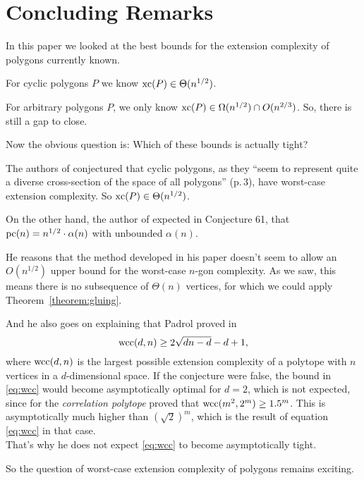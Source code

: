 \section{Concluding Remarks}

In this paper we looked at the best bounds for the extension complexity of polygons currently known. 

For cyclic polygons $P$ we know $\operatorname{xc}(P) \in \Theta(n^{1/2})$.

For arbitrary polygons $P$, we only know $\operatorname{xc}(P) \in \Omega(n^{1/2}) \cap O(n^{2/3})$. So, there is still a gap to close.

Now the obvious question is: Which of these bounds is actually tight?

The authors of \cite{kwan2020extension} conjectured that cyclic polygons, as they ``seem to represent quite a diverse cross-section of the space of all polygons'' (p.\,3), have worst-case extension complexity. So $\operatorname{xc}(P) \in \Theta(n^{1/2})$.

On the other hand, the author of \cite{shitov2020sublinear} expected in Conjecture 61, that $\operatorname{pc}(n) = n^{1/2} \cdot \alpha(n)$ with unbounded $\alpha(n)$.

He reasons that the method developed in his paper doesn't seem to allow an $O(n^{1/2})$ upper bound for the worst-case $n$-gon complexity. As we saw, this means there is no subsequence of $\Theta(n)$ vertices, for which we could apply Theorem~\ref{theorem:gluing}.

And he also goes on explaining that Padrol proved in \cite{padrol2016extension} 
\begin{equation}\label{eq:wcc}
  \operatorname{wcc}(d,n) \geq 2\sqrt{dn-d}-d+1 ,
\end{equation}
where $\operatorname{wcc}(d,n)$ is the largest possible extension complexity of a polytope with $n$ vertices in a $d$-dimensional space. 
If the conjecture were false, the bound in \eqref{eq:wcc} would become asymptotically optimal for $d=2$, which is not expected, since for the \emph{correlation polytope} \cite{kaibel2015short} proved that $\operatorname{wcc}(m^2,2^m) \geq 1.5^m$. This is asymptotically much higher than $(\sqrt{2})^m$, which is the result of equation \eqref{eq:wcc} in that case.\\
That's why he does not expect \eqref{eq:wcc} to become asymptotically tight.

So the question of worst-case extension complexity of polygons remains exciting.
